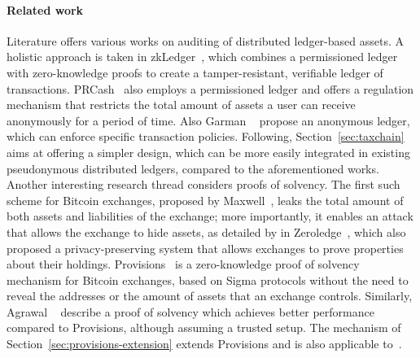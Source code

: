 \paragraph{Related work}
Literature offers various works on auditing of distributed ledger-based assets.
A holistic approach is taken in zkLedger~\cite{narula2018zkledger}, which
combines a permissioned ledger with zero-knowledge proofs to create a
tamper-resistant, verifiable ledger of transactions.
PRCash~\cite{EPRINT:WKCC18} also employs a permissioned ledger and offers a
regulation mechanism that restricts the total amount of assets a user can
receive anonymously for a period of time. Also Garman
\etal~\cite{FC:GarGreMie16} propose an anonymous ledger, which can enforce
specific transaction policies. Following, Section~\ref{sec:taxchain} aims at
offering a simpler design, which can be more easily integrated in existing
pseudonymous distributed ledgers, compared to the aforementioned works. Another
interesting research thread considers proofs of solvency. The first such scheme
for Bitcoin exchanges, proposed by Maxwell~\cite{wilcox2014proving}, leaks the
total amount of both assets and liabilities of the exchange; more importantly,
it enables an attack that allows the exchange to hide assets, as detailed by in
Zeroledge~\cite{doernerzeroledge}, which also proposed a privacy-preserving
system that allows exchanges to prove properties about their holdings.
Provisions~\cite{CCS:DBBCB15} is a zero-knowledge proof of solvency mechanism
for Bitcoin exchanges, based on Sigma protocols \ie without the need to reveal
the addresses or the amount of assets that an exchange controls. Similarly,
Agrawal \etal~\cite{C:AgrGanMoh18} describe a proof of solvency which achieves
better performance compared to Provisions, although assuming a trusted setup.
The mechanism of Section~\ref{sec:provisions-extension} extends
Provisions and is also applicable to~\cite{C:AgrGanMoh18}.
